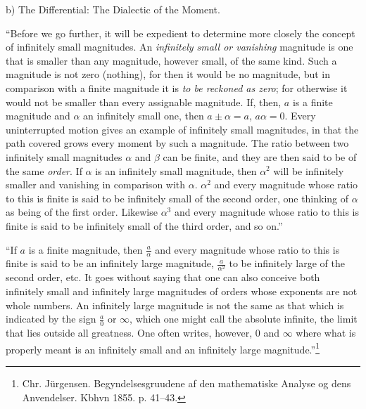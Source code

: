 \documentclass[12pt,a4paper,openany]{book}
\newcommand{\opage}[1]{\marginnote{\footnotesize\textit{[#1]}}}
\begin{document}
\begin{center}

b) The Differential: The Dialectic of the Moment.\end{center}

``Before we go further, it will be expedient
to determine more closely the concept of infinitely small magnitudes.
An \emph{infinitely small or vanishing} magnitude
is one that is smaller than any magnitude, however small,
of the same kind. Such a magnitude is not zero
(nothing), for then it would be no magnitude, but in comparison
with a finite magnitude it is \emph{to be reckoned as
zero}; for otherwise it would not be smaller than every assignable
magnitude. If, then, $a$ is a finite magnitude and $\alpha$ an infinitely small one, then $a\pm\alpha=a$, $a\alpha=0$. Every uninterrupted
motion gives an example of infinitely small magnitudes, in that
the path covered grows every moment by such a
\setcounter{footnote}{0}%
\opage{77}magnitude. The ratio between two infinitely small magnitudes $\alpha$ and $\beta$ can be finite, and they are then said to be of the same
\emph{order}. If $\alpha$ is an infinitely small magnitude, then $\alpha^{2}$ will be
infinitely smaller and vanishing in comparison with $\alpha$. $\alpha^{2}$ and every magnitude whose ratio to this is finite
is said to be infinitely small of the second order, one thinking
of $\alpha$ as being of the first order. Likewise $\alpha^{3}$ and
every magnitude whose ratio to this is finite is said to
be infinitely small of the third order, and so on.''

``If $a$ is a finite magnitude, then $\frac{a}{\alpha}$ and every magnitude
whose ratio to this is finite is said to be an infinitely
large magnitude, $\frac{a}{\alpha^{2}}$ to be infinitely large of the second order,
etc. It goes without saying that one can also conceive
both infinitely small and infinitely large magnitudes of orders
whose exponents are not whole numbers. An infinitely
large magnitude is not the same as that which is indicated by the
sign $\frac{a}{0}$ or $\infty$, which one might call the absolute
infinite, the limit that lies outside all greatness.
One often writes, however, $0$ and $\infty$ where what is properly
meant is an infinitely small and an infinitely large magnitude.''\footnote[1]{Chr. Jürgensen. Begyndelsesgruudene af den mathematiske Analyse og dens Anvendelser. Kbhvn 1855. p. 41--43.} %
\end{document}
